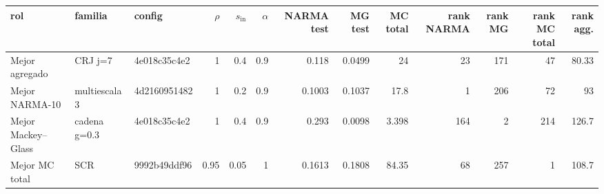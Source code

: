 \begin{tabular}{lllrrrrrrrrrr}
\toprule
rol & familia & config & $\rho$ & $s_{\mathrm{in}}$ & $\alpha$ & NARMA test & MG test & MC total & rank NARMA & rank MG & rank MC total & rank agg. \\
\midrule
Mejor agregado & CRJ j=7 & 4e018c35c4e2 & 1 & 0.4 & 0.9 & 0.118 & 0.0499 & 24 & 23 & 171 & 47 & 80.33 \\
Mejor NARMA-10 & multiescala 3 & 4d2160951482 & 1 & 0.2 & 0.9 & 0.1003 & 0.1037 & 17.8 & 1 & 206 & 72 & 93 \\
Mejor Mackey–Glass & cadena g=0.3 & 4e018c35c4e2 & 1 & 0.4 & 0.9 & 0.293 & 0.0098 & 3.398 & 164 & 2 & 214 & 126.7 \\
Mejor MC total & SCR & 9992b49ddf96 & 0.95 & 0.05 & 1 & 0.1613 & 0.1808 & 84.35 & 68 & 257 & 1 & 108.7 \\
\bottomrule
\end{tabular}
